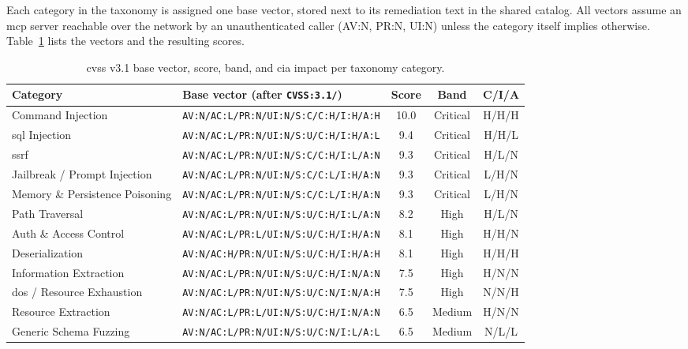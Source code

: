 Each category in the taxonomy is assigned one base vector, stored next to its remediation text in the shared catalog. All vectors assume an \gls{mcp} server reachable over the network by an unauthenticated caller (AV:N, PR:N, UI:N) unless the category itself implies otherwise. Table~\ref{tab:cvss} lists the vectors and the resulting scores.

\begin{table}[htbp]
\centering
\footnotesize
\begin{tabular}{p{3.3cm} l c c c}
\hline
\textbf{Category} & \textbf{Base vector (after \texttt{CVSS:3.1/})} & \textbf{Score} & \textbf{Band} & \textbf{C/I/A} \\
\hline
Command Injection & \texttt{AV:N/AC:L/PR:N/UI:N/S:C/C:H/I:H/A:H} & 10.0 & Critical & H/H/H \\
\acrshort{sql} Injection & \texttt{AV:N/AC:L/PR:N/UI:N/S:U/C:H/I:H/A:L} & 9.4 & Critical & H/H/L \\
\acrshort{ssrf} & \texttt{AV:N/AC:L/PR:N/UI:N/S:C/C:H/I:L/A:N} & 9.3 & Critical & H/L/N \\
Jailbreak / Prompt Injection & \texttt{AV:N/AC:L/PR:N/UI:N/S:C/C:L/I:H/A:N} & 9.3 & Critical & L/H/N \\
Memory \& Persistence Poisoning & \texttt{AV:N/AC:L/PR:N/UI:N/S:C/C:L/I:H/A:N} & 9.3 & Critical & L/H/N \\
Path Traversal & \texttt{AV:N/AC:L/PR:N/UI:N/S:U/C:H/I:L/A:N} & 8.2 & High & H/L/N \\
Auth \& Access Control & \texttt{AV:N/AC:L/PR:L/UI:N/S:U/C:H/I:H/A:N} & 8.1 & High & H/H/N \\
Deserialization & \texttt{AV:N/AC:H/PR:N/UI:N/S:U/C:H/I:H/A:H} & 8.1 & High & H/H/H \\
Information Extraction & \texttt{AV:N/AC:L/PR:N/UI:N/S:U/C:H/I:N/A:N} & 7.5 & High & H/N/N \\
\acrshort{dos} / Resource Exhaustion & \texttt{AV:N/AC:L/PR:N/UI:N/S:U/C:N/I:N/A:H} & 7.5 & High & N/N/H \\
Resource Extraction & \texttt{AV:N/AC:L/PR:L/UI:N/S:U/C:H/I:N/A:N} & 6.5 & Medium & H/N/N \\
Generic Schema Fuzzing & \texttt{AV:N/AC:L/PR:N/UI:N/S:U/C:N/I:L/A:L} & 6.5 & Medium & N/L/L \\
\hline
\end{tabular}
\caption{\gls{cvss} v3.1 base vector, score, band, and \gls{cia} impact per taxonomy category.}
\label{tab:cvss}
\end{table}

